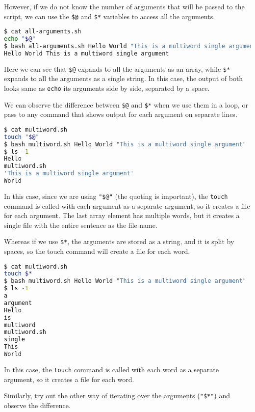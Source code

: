 However, if we do not know the number of arguments that will be passed to the script, we can use the \lstinline{$@} and \lstinline{$*} variables to access all the arguments.

\begin{lstlisting}[language=bash]
$ cat all-arguments.sh
echo "$@"
$ bash all-arguments.sh Hello World "This is a multiword single argument"
Hello World This is a multiword single argument
\end{lstlisting}

Here we can see that \lstinline{$@} expands to all the arguments as an array, while \lstinline{$*} expands to all the arguments as a single string.
In this case, the output of both looks same as \lstinline{echo} its arguments side by side, separated by a space.

We can observe the difference between \lstinline{$@} and \lstinline{$*} when we use them in a loop, or pass to any command that shows output for each argument on separate lines.

\begin{lstlisting}[language=bash]
$ cat multiword.sh
touch "$@"
$ bash multiword.sh Hello World "This is a multiword single argument"
$ ls -1
Hello
multiword.sh
'This is a multiword single argument'
World
\end{lstlisting}

In this case, since we are using \lstinline{"$@"} (the quoting is important), the \lstinline{touch} command is called with each argument as a separate argument, so it creates a file for each argument. The last array element has multiple words, but it creates a single file with the entire sentence as the file name.

Whereas if we use \lstinline{$*}, the arguments are stored as a string, and it is split by spaces, so the touch command will create a file for each word.

\begin{lstlisting}[language=bash]
$ cat multiword.sh
touch $*
$ bash multiword.sh Hello World "This is a multiword single argument"
$ ls -1
a
argument
Hello
is
multiword
multiword.sh
single
This
World
\end{lstlisting}

In this case, the \lstinline{touch} command is called with each word as a separate argument, so it creates a file for each word.

\begin{exercise}
  Similarly, try out the other way of iterating over the arguments (\lstinline{"$*"}) and observe the difference.
\end{exercise}

